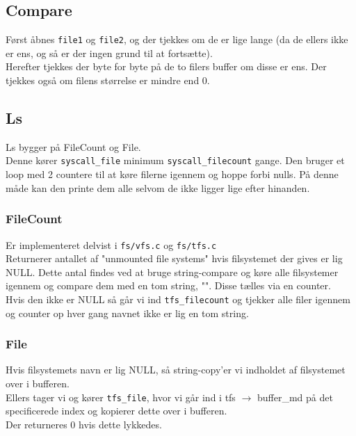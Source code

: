 \documentclass[a4paper,12pt]{article}
\begin{document}
\subsection*{Compare}
Først åbnes \texttt{file1} og \texttt{file2}, og der tjekkes om de er lige lange (da de ellers ikke er ens, og så er der ingen grund til at fortsætte). 
\\
Herefter tjekkes der byte for byte på de to filers buffer om disse er ens. Der tjekkes også om filens størrelse er mindre end 0.


\subsection*{Ls}
Ls bygger på FileCount og File. \\
Denne kører \texttt{syscall\_file} minimum \texttt{syscall\_filecount} gange.
Den bruger et loop med 2 countere til at køre filerne igennem og hoppe forbi nulls. På denne måde kan den printe dem alle selvom de ikke ligger lige efter hinanden.

\subsubsection*{FileCount}
Er implementeret delvist i \texttt{fs/vfs.c} og \texttt{fs/tfs.c} 
\\
Returnerer antallet af "unmounted file systems" hvis filsystemet der gives er lig NULL.
Dette antal findes ved at bruge string-compare og køre alle filsystemer igennem og compare dem med en tom string, "". Disse tælles via en counter. 
\\
Hvis den ikke er NULL så går vi ind \texttt{tfs\_filecount} og tjekker alle filer igennem og counter op hver gang navnet ikke er lig en tom string.

\subsubsection*{File}
Hvis filsystemets navn er lig NULL, så string-copy'er vi indholdet af filsystemet over i bufferen.
\\
Ellers tager vi og kører \texttt{tfs\_file}, hvor vi går ind i tfs $\rightarrow$ buffer\_md på det specificerede index og kopierer dette over i bufferen.
\\
Der returneres 0 hvis dette lykkedes.
\end{document}
